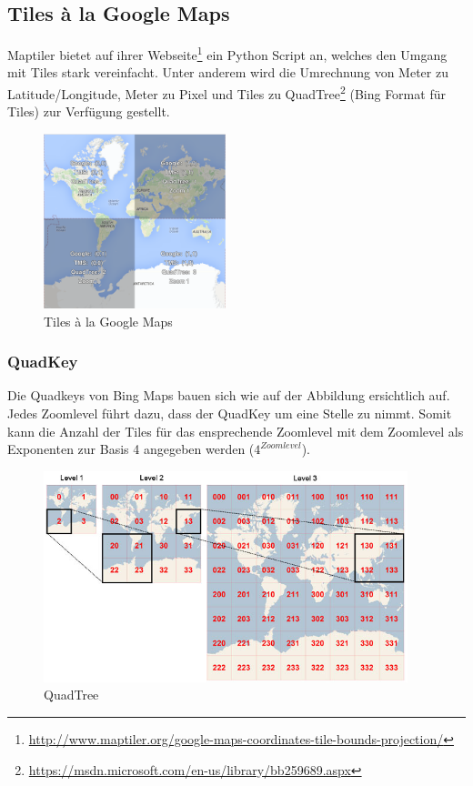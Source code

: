 \subsection{Tiles à la Google Maps}
\label{subsec:tiles}
\Gls{Maptiler} bietet auf ihrer Webseite\footnote{\url{http://www.maptiler.org/google-maps-coordinates-tile-bounds-projection/}} ein Python Script an, welches den Umgang mit Tiles stark vereinfacht. Unter anderem wird die Umrechnung von Meter zu Latitude/Longitude, Meter zu Pixel und Tiles zu QuadTree\footnote{\url{https://msdn.microsoft.com/en-us/library/bb259689.aspx}} (Bing Format für Tiles) zur Verfügung gestellt.\\

\begin{figure}[H]
\centering
\includegraphics[width=150pt]{images/tiles_a_la_google.png}
\caption[Tiles à la Google Maps]{Tiles à la Google Maps}
\end{figure}

\subsubsection{QuadKey}
Die \Gls{Quadkeys} von Bing Maps bauen sich wie auf der Abbildung ersichtlich auf. Jedes Zoomlevel führt dazu, dass der QuadKey um eine Stelle zu nimmt. Somit kann die Anzahl der Tiles für das ensprechende Zoomlevel mit dem Zoomlevel als Exponenten zur Basis 4 angegeben werden ($4^{Zoomlevel}$).  \\
\begin{figure}[H]
\centering
\includegraphics[width=300pt]{images/quadkey.png}
\caption[QuadTree]{QuadTree}
\end{figure}
\newpage
